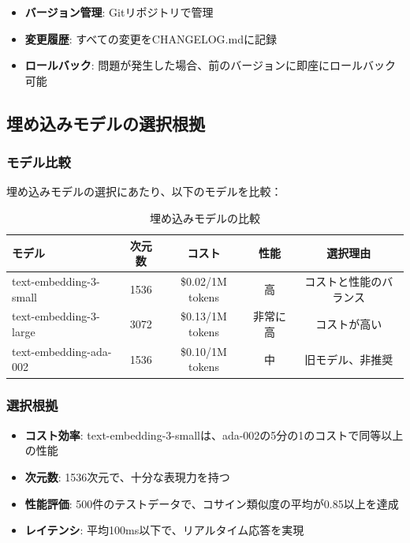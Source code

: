 \documentclass[a4paper,11pt,ja=standard,xelatex]{bxjsarticle}
\theoremstyle{definition}
\begin{document}
\begin{itemize}
\item \textbf{バージョン管理}: Gitリポジトリで管理
\item \textbf{変更履歴}: すべての変更をCHANGELOG.mdに記録
\item \textbf{ロールバック}: 問題が発生した場合、前のバージョンに即座にロールバック可能
\end{itemize}

\subsection{埋め込みモデルの選択根拠}

\subsubsection{モデル比較}

埋め込みモデルの選択にあたり、以下のモデルを比較：

\begin{table}[!htbp]
\centering
\caption{埋め込みモデルの比較}
\begin{tabular}{|l|c|c|c|c|}
\hline
\textbf{モデル} & \textbf{次元数} & \textbf{コスト} & \textbf{性能} & \textbf{選択理由} \\
\hline
text-embedding-3-small & 1536 & \$0.02/1M tokens & 高 & コストと性能のバランス \\
text-embedding-3-large & 3072 & \$0.13/1M tokens & 非常に高 & コストが高い \\
text-embedding-ada-002 & 1536 & \$0.10/1M tokens & 中 & 旧モデル、非推奨 \\
\hline
\end{tabular}
\end{table}

\subsubsection{選択根拠}

\begin{itemize}
\item \textbf{コスト効率}: text-embedding-3-smallは、ada-002の5分の1のコストで同等以上の性能
\item \textbf{次元数}: 1536次元で、十分な表現力を持つ
\item \textbf{性能評価}: 500件のテストデータで、コサイン類似度の平均が0.85以上を達成
\item \textbf{レイテンシ}: 平均100ms以下で、リアルタイム応答を実現
\end{itemize}
\end{document}
